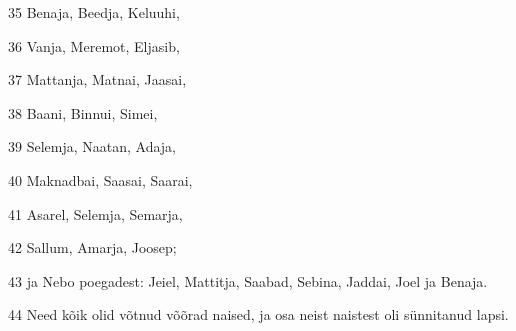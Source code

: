 \par 35 Benaja, Beedja, Keluuhi,
\par 36 Vanja, Meremot, Eljasib,
\par 37 Mattanja, Matnai, Jaasai,
\par 38 Baani, Binnui, Simei,
\par 39 Selemja, Naatan, Adaja,
\par 40 Maknadbai, Saasai, Saarai,
\par 41 Asarel, Selemja, Semarja,
\par 42 Sallum, Amarja, Joosep;
\par 43 ja Nebo poegadest: Jeiel, Mattitja, Saabad, Sebina, Jaddai, Joel ja Benaja.
\par 44 Need kõik olid võtnud võõrad naised, ja osa neist naistest oli sünnitanud lapsi.



